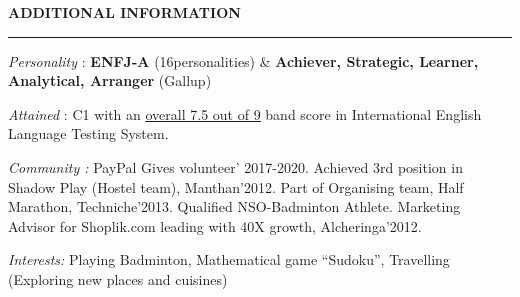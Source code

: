 \documentclass[10pt,letterpaper]{article}
\newcommand{\urlIELTS}{https://bit.ly/3gjVfzE}
\newlength{\blockindent}   \setlength{\blockindent}{11.5pt}
\newlength{\textrightinset}\setlength{\textrightinset}{5.25pt}   %
\newcommand{\bd}[1]{\textbf{#1}}
\newcommand{\ulink}[2]{\href{#1}{\textcolor{linkblue}{\underline{#2}}}}
\newcommand{\sectionbar}[3]{%
  \par\vspace{#1}%
  \centerline{\bfseries\fontsize{10.5}{12}\selectfont #3}%
  \par\nointerlineskip\vspace{3pt}%
  \noindent\rule{\linewidth}{#2}\par\vspace{1pt}}
\newcommand{\sect}[2][9pt]{\sectionbar{#1}{1.3pt}{#2}}
\newenvironment{indented}{%
  \list{}{\leftmargin=\blockindent\rightmargin=\textrightinset\topsep=0pt\partopsep=0pt
          \parsep=0pt\itemsep=0pt\listparindent=0pt}\item\relax}{\endlist}
\begin{document}
\sect[23pt]{ADDITIONAL INFORMATION}
\vspace{-1pt}
\begin{indented}
\textit{Personality} : \bd{ENFJ-A} (16personalities) \& \bd{Achiever, Strategic, Learner,
Analytical, Arranger} (Gallup)\par
\textit{Attained} : C1 with an \ulink{\urlIELTS}{overall 7.5 out of 9} band score in
International English Language Testing System.\par
\textit{Community :} PayPal Gives volunteer' 2017-2020. Achieved 3rd position in Shadow
Play (Hostel team), Manthan'2012. Part of Organising team, Half Marathon, Techniche'2013.
Qualified NSO-Badminton Athlete. Marketing Advisor for Shoplik.com leading with 40X growth,
Alcheringa'2012.\par
\textit{Interests:} Playing Badminton, Mathematical game ``Sudoku'', Travelling (Exploring
new places and cuisines)
\end{indented}
\end{document}

